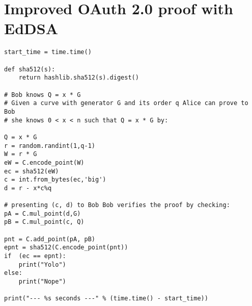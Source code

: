 \section{Improved OAuth 2.0 proof with EdDSA}

\begin{lstlisting}
start_time = time.time()

def sha512(s):
    return hashlib.sha512(s).digest()
    
# Bob knows Q = x * G
# Given a curve with generator G and its order q Alice can prove to Bob
# she knows 0 < x < n such that Q = x * G by: 

Q = x * G
r = random.randint(1,q-1) 
W = r * G
eW = C.encode_point(W)
ec = sha512(eW)
c = int.from_bytes(ec,'big')
d = r - x*c%q 

# presenting (c, d) to Bob Bob verifies the proof by checking:
pA = C.mul_point(d,G)
pB = C.mul_point(c, Q)

pnt = C.add_point(pA, pB)
epnt = sha512(C.encode_point(pnt))
if  (ec == epnt):
    print("Yolo")
else:
    print("Nope")
    
print("--- %s seconds ---" % (time.time() - start_time))

\end{lstlisting}
